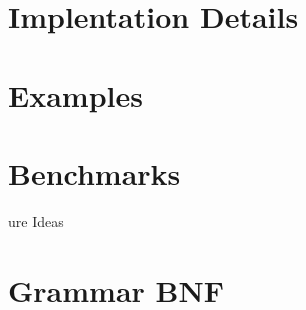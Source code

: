 \documentclass[11pt]{article}
\begin{document}
\section{Implentation Details}
\label{sec:org640bc28}
\section{Examples}
\label{sec:orgc9320c8}
\section{Benchmarks}
\label{sec:org31e501b}
ure Ideas
\section{Grammar BNF}
\label{sec:org921118d}
\end{document}

